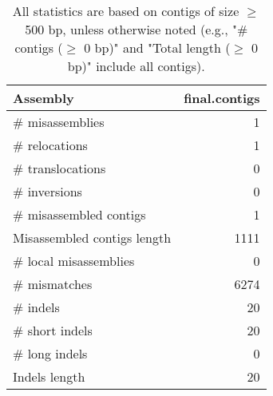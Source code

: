 \documentclass[12pt,a4paper]{article}
\begin{document}
\begin{table}[ht]
\begin{center}
\caption{All statistics are based on contigs of size $\geq$ 500 bp, unless otherwise noted (e.g., "\# contigs ($\geq$ 0 bp)" and "Total length ($\geq$ 0 bp)" include all contigs).}
\begin{tabular}{|l*{1}{|r}|}
\hline
Assembly & final.contigs \\ \hline
\# misassemblies & 1 \\ \hline
\hspace{5mm}\# relocations & 1 \\ \hline
\hspace{5mm}\# translocations & 0 \\ \hline
\hspace{5mm}\# inversions & 0 \\ \hline
\# misassembled contigs & 1 \\ \hline
Misassembled contigs length & 1111 \\ \hline
\# local misassemblies & 0 \\ \hline
\# mismatches & 6274 \\ \hline
\# indels & 20 \\ \hline
\hspace{5mm}\# short indels & 20 \\ \hline
\hspace{5mm}\# long indels & 0 \\ \hline
Indels length & 20 \\ \hline
\end{tabular}
\end{center}
\end{table}
\end{document}
